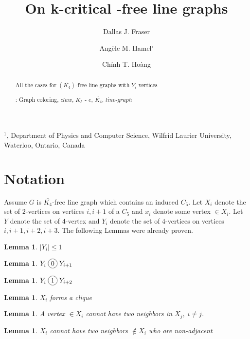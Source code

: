 \documentclass[12pt]{article}
\title{On k-critical {\FAM}-free line graphs}
\author{
	Dallas J. Fraser\inst{1}
	\and Ang\`ele M. Hamel'\inst{1}
	\and Ch\'inh T. Ho\`ang\inst{1}
}
\newcommand*\circled[1]{\tikz[baseline=(char.base)]{
            \node[shape=circle,draw,inner sep=2pt] (char) {#1};}}
\newtheorem{Lemma}[Theorem]{Lemma}
\def\inst#1{$^{#1}$}
\begin{document}
\maketitle

\begin{center}
{\footnotesize

\inst{1}, Department of Physics and Computer Science, Wilfrid Laurier
University, \\Waterloo, Ontario, Canada}

\end{center}

\begin{abstract}
All the cases for $(\overline{K_4})$-free line graphs with $Y_i$ vertices

: Graph coloring, $claw$, $K_5$ - $e$, $\overline{K_4}$, $line$-$graph$ 
\end{abstract}


\section{Notation}\label{sec:intro}
Assume $G$ is $\overline{K_4}$-free line graph which contains an induced $C_5$. Let $X_i$ denote the set of $2$-vertices on vertices $i,i+1$ of a $C_5$ and $x_i$ denote some vertex $\in X_i$. Let $Y$ denote the set of $4$-vertex and $Y_i$ denote the set of $4$-vertices on vertices $i, i+1,i+2,i+3$. The following Lemmas were already proven.

\begin{Lemma}\label{lem:c5-4vertex-bounded}
$|Y_i| \leq 1$
\end{Lemma}

\begin{Lemma}\label{lem:yi-cojoins-yi1}
$Y_i \;\circled{0}\; Y_{i+1}$
\end{Lemma}

\begin{Lemma}\label{lem:yi-joins-yi2}
$Y_i \;\circled{1}\; Y_{i+2}$
\end{Lemma}

\begin{Lemma}\label{lem:xi-clique}
$X_i$ forms a clique
\end{Lemma}

\begin{Lemma}\label{lem:2xi-cojoins-xj}
A vertex $\in X_i$ cannot have two neighbors in $X_j,\; i \neq j$.
\end{Lemma}

\begin{Lemma}\label{lem:xi-neighbor-adjacent}
$X_i$ cannot have two neighbors $\not \in X_i$ who are non-adjacent
\end{Lemma}
\end{document}
